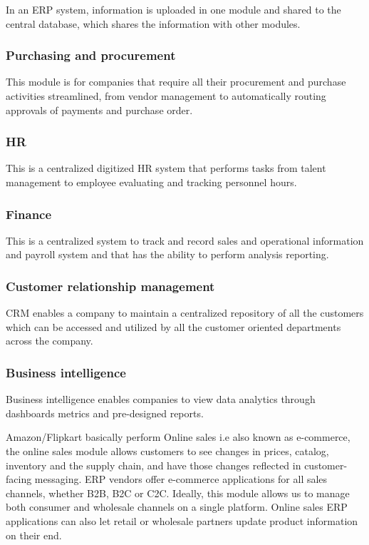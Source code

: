 \documentclass[12pt, a4paper]{article}
\begin{document}
In an ERP system, information is uploaded in one module and shared to the central database, which shares the information with other modules.

\subsubsection{Purchasing and procurement}
This module is for companies that require all their procurement and purchase activities streamlined, from vendor management to automatically routing approvals of payments and purchase order.

\subsubsection{HR}
This is a centralized digitized HR system that performs tasks from talent management to employee evaluating and tracking personnel hours.

\subsubsection{Finance}
This is a centralized system to track and record sales and operational information and payroll system and that has the ability to perform analysis reporting.

\subsubsection{Customer relationship management}
CRM enables a company to maintain a centralized repository of all the customers which can be accessed and utilized by all the customer oriented departments across the company.

\subsubsection{Business intelligence}
Business intelligence enables companies to view data analytics through dashboards metrics and pre-designed reports.

Amazon/Flipkart basically perform Online sales i.e  also known as e-commerce, the online sales module allows customers to see changes in prices, catalog, inventory and the supply chain, and have those changes reflected in customer-facing messaging. ERP vendors offer e-commerce applications for all sales channels, whether B2B, B2C or C2C. Ideally, this module allows us to manage both consumer and wholesale channels on a single platform. Online sales ERP applications can also let retail or wholesale partners update product information on their end.
\end{document}
